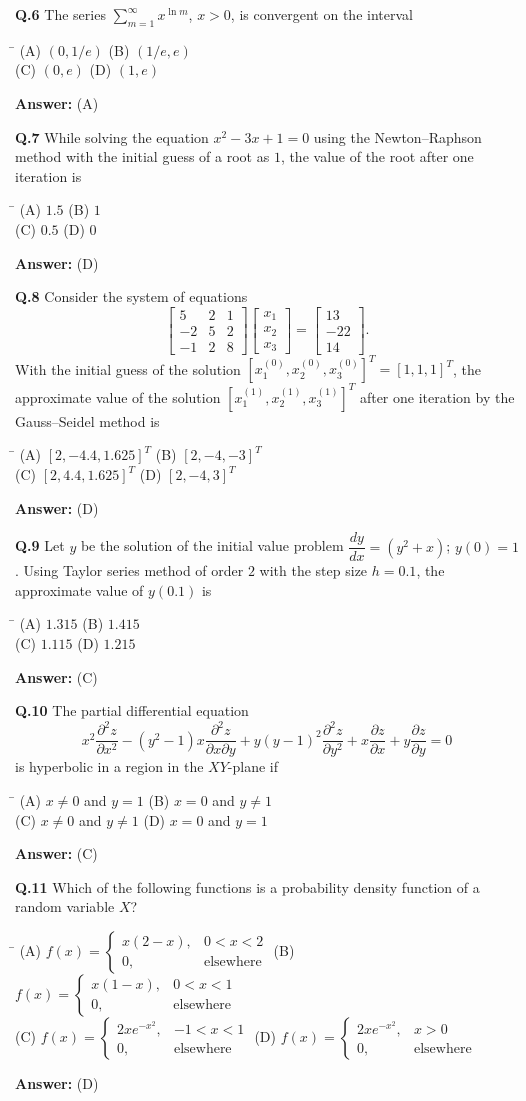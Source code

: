 \documentclass[11pt,a4paper]{article}
\newcommand{\optsfourA}[4]{%
  \begin{tabbing}
    \hspace{0.48\linewidth}\=\kill
    (A) #1 \> (B) #2 \\[2pt]
    (C) #3 \> (D) #4
  \end{tabbing}%
}
\newcommand{\ans}[1]{\textbf{Answer:} #1\par\medskip}
\begin{document}
\textbf{Q.6} The series $\displaystyle\sum_{m=1}^{\infty} x^{\ln m}$, $x > 0$, is convergent on the interval
\optsfourA{$(0, 1/e)$}{$(1/e, e)$}{$(0, e)$}{$(1, e)$}
\ans{(A)}

\textbf{Q.7} While solving the equation $x^2 - 3x + 1 = 0$ using the Newton--Raphson method with the initial guess of a root as $1$, the value of the root after one iteration is
\optsfourA{$1.5$}{$1$}{$0.5$}{$0$}
\ans{(D)}

\textbf{Q.8} Consider the system of equations
\[
  \begin{bmatrix} 5 & 2 & 1 \\ -2 & 5 & 2 \\ -1 & 2 & 8 \end{bmatrix}
  \begin{bmatrix} x_1 \\ x_2 \\ x_3 \end{bmatrix}
  =
  \begin{bmatrix} 13 \\ -22 \\ 14 \end{bmatrix}.
\]
With the initial guess of the solution $[x_1^{(0)}, x_2^{(0)}, x_3^{(0)}]^T = [1, 1, 1]^T$, the approximate value of the solution $[x_1^{(1)}, x_2^{(1)}, x_3^{(1)}]^T$ after one iteration by the Gauss--Seidel method is
\optsfourA{$[2, -4.4, 1.625]^T$}{$[2, -4, -3]^T$}{$[2, 4.4, 1.625]^T$}{$[2, -4, 3]^T$}
\ans{(D)}

\textbf{Q.9} Let $y$ be the solution of the initial value problem $\dfrac{dy}{dx} = (y^2 + x)$; $y(0) = 1$. Using Taylor series method of order $2$ with the step size $h = 0.1$, the approximate value of $y(0.1)$ is
\optsfourA{$1.315$}{$1.415$}{$1.115$}{$1.215$}
\ans{(C)}

\textbf{Q.10} The partial differential equation
\[
  x^2\frac{\partial^2 z}{\partial x^2} - (y^2 - 1)x\frac{\partial^2 z}{\partial x \partial y} + y(y - 1)^2\frac{\partial^2 z}{\partial y^2} + x\frac{\partial z}{\partial x} + y\frac{\partial z}{\partial y} = 0
\]
is hyperbolic in a region in the $XY$-plane if
\optsfourA{$x \ne 0$ and $y = 1$}{$x = 0$ and $y \ne 1$}{$x \ne 0$ and $y \ne 1$}{$x = 0$ and $y = 1$}
\ans{(C)}

\textbf{Q.11} Which of the following functions is a probability density function of a random variable $X$?
\optsfourA{$f(x) = \begin{cases} x(2 - x), & 0 < x < 2 \\ 0, & \text{elsewhere} \end{cases}$}{$f(x) = \begin{cases} x(1 - x), & 0 < x < 1 \\ 0, & \text{elsewhere} \end{cases}$}{$f(x) = \begin{cases} 2x e^{-x^2}, & -1 < x < 1 \\ 0, & \text{elsewhere} \end{cases}$}{$f(x) = \begin{cases} 2x e^{-x^2}, & x > 0 \\ 0, & \text{elsewhere} \end{cases}$}
\ans{(D)}
\end{document}
